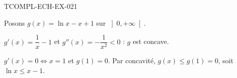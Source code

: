 \begin{corrige}{TCOMPL-ECH-EX-021}

Posons $g(x) = \ln x - x + 1$ sur $\left]0, +\infty\right[$.


$g'(x) = \dfrac{1}{x} - 1$ et $g''(x) = -\dfrac{1}{x^2} < 0$ : $g$ est concave.

$g'(x) = 0 \iff x = 1$ et $g(1) = 0$. Par concavité, $g(x) \leq g(1) = 0$, soit $\ln x \leq x - 1$.

\end{corrige}
